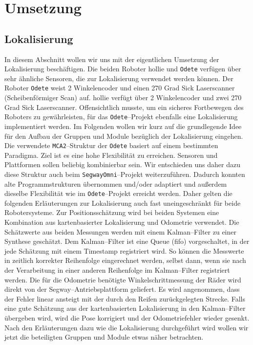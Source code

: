  
\section{Umsetzung}
\label{lokalisierung_umsetzung_sec}
\authorsection{\editorandreas, \editordirk}
\subsection{Lokalisierung} 
In diesem Abschnitt wollen wir uns mit der eigentlichen Umsetzung der
 Lokalisierung beschäftigen. Die beiden Roboter \gls{hollie} und
 \lstinline{Odete} verfügen über sehr ähnliche Sensoren, die zur Lokalisierung
 verwendet werden können. Der Roboter \lstinline{Odete} weist 2 Winkelencoder und einen 270 Grad Sick
 Laserscanner (Scheibenförmiger Scan) auf.
 \gls{hollie} verfügt über 2 Winkelencoder und zwei
 270 Grad Sick Laserscanner.
 Offensichtlich musste, um ein sicheres Fortbewegen des Roboters zu
 gewährleisten, für das \lstinline{Odete}--Projekt ebenfalls eine Lokalisierung implementiert werden.
 Im Folgenden wollen wir kurz auf die grundlegende Idee für den Aufbau der
 Gruppen und Module bezüglich der Lokalisierung eingehen.
 Die verwendete \lstinline{MCA2}--Struktur der \lstinline{Odete} basiert auf
 einem bestimmten Paradigma.
 Ziel ist es eine hohe Flexibilität zu erreichen. Sensoren und Plattformen sollen
 beliebig kombinierbar sein. Wir entschieden uns daher dazu diese Struktur auch
 beim \lstinline{SegwayOmni}--Projekt weiterzuführen. Dadurch konnten alte
 Programmstrukturen übernommen und/oder adaptiert und außerdem dieselbe
 Flexibilität wie im \lstinline{Odete}--Projekt erreicht werden. Daher gelten die folgenden Erläuterungen
 zur Lokalisierung auch fast uneingeschränkt für beide Robotersysteme.
 Zur Positionsschätzung wird bei beiden Systemen eine Kombination aus
 kartenbasierter Lokalisierung und Odometrie verwendet. Die Schätzwerte aus beiden Messungen werden mit einem Kalman--Filter zu einer
 Synthese geschätzt. Dem Kalman--Filter ist eine Queue (\gls{fifo}) vorgeschaltet, in der jede Schätzung
 mit einem Timestamp registriert wird. So können die Messwerte in zeitlich korrekter Reihenfolge
 eingerechnet werden, selbst dann, wenn sie nach der Verarbeitung in einer anderen Reihenfolge
 im Kalman--Filter registriert werden. Die für die Odometrie benötigte Winkelschrittmessung der Räder wird direkt
 von der Segway--Antriebsplattform geliefert.
 Es wird angenommen, dass der Fehler linear ansteigt mit der durch den Reifen zurückgelegten Strecke.
 Falls eine gute Schätzung aus der kartenbasierten Lokalisierung in den Kalman--Filter übergeben wird,
 wird die Pose korrigiert und der Odometriefehler wieder gesenkt.
 Nach den Erläuterungen dazu wie die Lokalisierung durchgeführt wird wollen wir
 jetzt die beteiligten Gruppen und Module etwas näher betrachten. 

